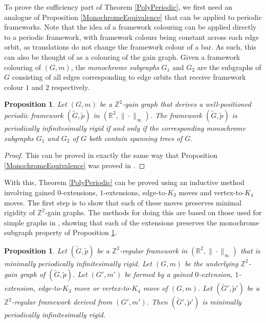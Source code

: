 \documentclass[reqno,a4paper,10pt]{article}
\newtheorem{proposition}[theorem]{Proposition}
\theoremstyle{definition}
\theoremstyle{remark}
\numberwithin{equation}{section}
\numberwithin{figure}{section}
\numberwithin{table}{section}
\newcommand{\R}{\mathbb{R}}
\newcommand{\Z}{\mathbb{Z}}
\newcommand{\G}{\tilde{G}}
\newcommand{\p}{\tilde{p}}
\begin{document}
    To prove the sufficiency part of Theorem \ref{PolyPeriodic}, we first need an analogue of Proposition \ref{MonochromeEquivalence} that can be applied to periodic frameworks. Note that the idea of a framework colouring can be applied directly to a periodic framework, with framework colours being constant across each edge orbit, as translations do not change the framework colour of a bar. As such, this can also be thought of as a colouring of the gain graph. Given a framework colouring of $(G,m)$, the \emph{monochrome subgraphs} $G_1$ and $G_2$ are the subgraphs of $G$ consisting of all edges corresponding to edge orbits that receive framework colour $1$ and $2$ respectively. 
    \begin{proposition}\label{MonochromeEquivalencePeriodic}
		Let $(G,m)$ be a $\Z^2$-gain graph that derives a well-positioned periodic framework $(\G,\p)$ in $(\R^2,\|\cdot\|_\infty)$. The framework $(\G,\p)$ is periodically infinitesimally rigid if and only if the corresponding monochrome subgraphs $G_1$ and $G_2$ of $G$ both contain spanning trees of $G$.
	\end{proposition}
    \begin{proof}
        This can be proved in exactly the same way that Proposition \ref{MonochromeEquivalence} was proved in \cite[Propositions 4.3 and 4.4]{NonEuclidean}.
    \end{proof}
    With this, Theorem \ref{PolyPeriodic} can be proved using an inductive method involving gained $0$-extensions, $1$-extensions, edge-to-$K_3$ moves and vertex-to-$K_4$ moves. The first step is to show that each of these moves preserves minimal rigidity of $\Z^2$-gain graphs. The methods for doing this are based on those used for simple graphs in \cite[Lemma 4.9]{NonEuclidean}, showing that each of the extensions preserves the monochrome subgraph property of Proposition \ref{MonochromeEquivalencePeriodic}.
    \begin{proposition}\label{PolyPeriodicExtensions}
		Let $(\G,\p)$ be a $\Z^2$-regular framework in $(\R^2,\|\cdot\|_{\infty})$ that is minimally periodically infinitesimally rigid. Let $(G,m)$ be the underlying $\Z^2$-gain graph of $(\G,\p)$. Let $(G',m')$ be formed by a gained $0$-extension, $1$-extension, edge-to-$K_3$ move or vertex-to-$K_4$ move of $(G,m)$. Let $(\G',\p')$ be a $\Z^2$-regular framework derived from $(G',m')$. Then $(\G',\p')$ is minimally periodically infinitesimally rigid.
	\end{proposition}
\end{document}
